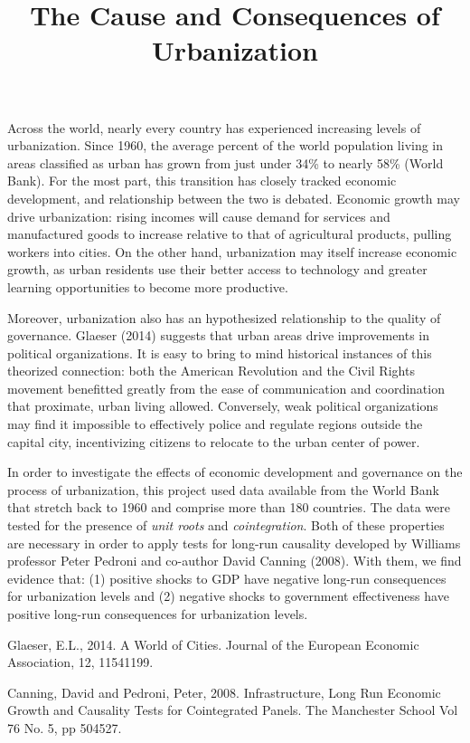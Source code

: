 \documentclass[12pt]{article}
\title{The Cause and Consequences of Urbanization}
\begin{document}
Across the world, nearly every country has experienced increasing levels of urbanization. Since 1960, the average percent of the world population living in areas classified as urban has grown from just under 34\% to nearly 58\% (World Bank). For the most part, this transition has closely tracked economic development, and relationship between the two is debated. Economic growth may drive urbanization: rising incomes will cause demand for services and manufactured goods to increase relative to that of agricultural products, pulling workers into cities. On the other hand, urbanization may itself increase economic growth, as urban residents use their better access to technology and greater learning opportunities to become more productive.

Moreover, urbanization also has an hypothesized relationship to the quality of governance. Glaeser (2014) suggests that urban areas drive improvements in political organizations. It is easy to bring to mind historical instances of this theorized connection: both the American Revolution and the Civil Rights movement benefitted greatly from the ease of communication and coordination that proximate, urban living allowed. Conversely, weak political organizations may find it impossible to effectively police and regulate regions outside the capital city, incentivizing citizens to relocate to the urban center of power.

In order to investigate the effects of economic development and governance on the process of urbanization, this project used data available from the World Bank that stretch back to 1960 and comprise more than 180 countries. The data were tested for the presence of \textit{unit roots} and \textit{cointegration}. Both of these properties are necessary in order to apply tests for long-run causality developed by Williams professor Peter Pedroni and co-author David Canning (2008). With them, we find evidence that: (1) positive shocks to GDP have negative long-run consequences for urbanization levels and (2) negative shocks to government effectiveness have positive long-run consequences for urbanization levels.

\begin{thebibliography}{9}

Glaeser, E.L., 2014. A World of Cities. Journal of the European Economic Association, 12, 11541199.

Canning, David and Pedroni, Peter, 2008. Infrastructure, Long Run Economic Growth and Causality Tests
for Cointegrated Panels. The Manchester School Vol 76 No. 5, pp 504527.

\end{thebibliography}
\end{document}
